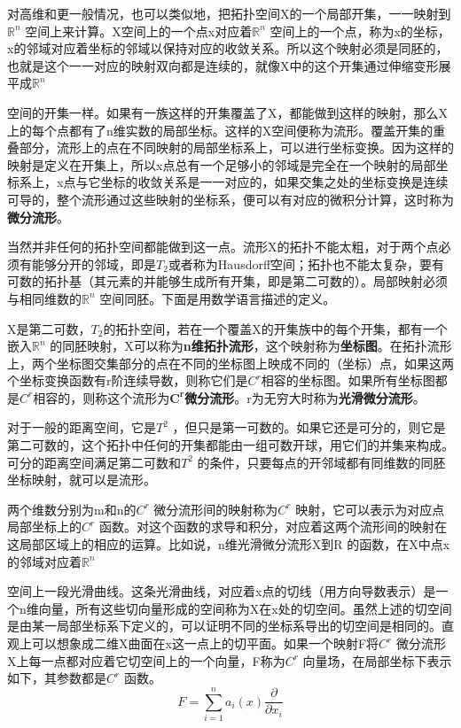 对高维和更一般情况，也可以类似地，把拓扑空间X的一个局部开集，一一映射到$ \mathbb{R}^n $ 
空间上来计算。X空间上的一个点x对应着$ \mathbb{R}^n $ 空间上的一个点，称为x的坐标，x的邻域对应着坐标的邻域以保持对应的收敛关系。所以这个映射必须是同胚的，也就是这个一一对应的映射双向都是连续的，就像X中的这个开集通过伸缩变形展平成$ \mathbb{R}^n $ 

空间的开集一样。如果有一族这样的开集覆盖了X，都能做到这样的映射，那么X上的每个点都有了n维实数的局部坐标。这样的X空间便称为流形。覆盖开集的重叠部分，流形上的点在不同映射的局部坐标系上，可以进行坐标变换。因为这样的映射是定义在开集上，所以x点总有一个足够小的邻域是完全在一个映射的局部坐标系上，x点与它坐标的收敛关系是一一对应的，如果交集之处的坐标变换是连续可导的，整个流形通过这些映射的坐标系，便可以有对应的微积分计算，这时称为\textbf{微分流形}。

当然并非任何的拓扑空间都能做到这一点。流形X的拓扑不能太粗，对于两个点必须有能够分开的邻域，即是$ T_2 $或者称为Hausdorff空间；拓扑也不能太复杂，要有可数的拓扑基（其元素的并能够生成所有开集，即是第二可数的）。局部映射必须与相同维数的$ \mathbb{R}^n $  空间同胚。下面是用数学语言描述的定义。

\kaishu\setlength{\leftskip}{1em}

X是第二可数，$ T_2 $的拓扑空间，若在一个覆盖X的开集族中的每个开集，都有一个嵌入$ \mathbb{R}^n $ 的同胚映射，X可以称为\textbf{n维拓扑流形}，这个映射称为\textbf{坐标图}。在拓扑流形上，两个坐标图交集部分的点在不同的坐标图上映成不同的（坐标）点，如果这两个坐标变换函数有r阶连续导数，则称它们是$ C^r $相容的坐标图。如果所有坐标图都是$ C^r $相容的，则称这个流形为$ \bm{C^r} $\textbf{微分流形}。r为无穷大时称为\textbf{光滑微分流形}。

\songti\setlength{\leftskip}{0em}

对于一般的距离空间，它是$ T^2 $ ，但只是第一可数的。如果它还是可分的，则它是第二可数的，这个拓扑中任何的开集都能由一组可数开球，用它们的并集来构成。可分的距离空间满足第二可数和$ T^2 $ 的条件，只要每点的开邻域都有同维数的同胚坐标映射，就可以是流形。

两个维数分别为m和n的$ C^r $ 微分流形间的映射称为$ C^r $ 映射，它可以表示为对应点局部坐标上的$ C^r $ 函数。对这个函数的求导和积分，对应着这两个流形间的映射在这局部区域上的相应的运算。比如说，n维光滑微分流形X到R
的函数，在X中点x的邻域对应着$ \mathbb{R}^n $ 

空间上一段光滑曲线。这条光滑曲线，对应着x点的切线（用方向导数表示）是一个n维向量，所有这些切向量形成的空间称为X在x处的切空间。虽然上述的切空间是由某一局部坐标系下定义的，可以证明不同的坐标系导出的切空间是相同的。直观上可以想象成二维X曲面在x这一点上的切平面。如果一个映射F将$ C^r $ 微分流形X上每一点都对应着它切空间上的一个向量，F称为$ C^r $ 向量场，在局部坐标下表示如下，其参数都是$ C^r $ 函数。
\begin{equation}
	F = \sum _{i=1}^n a_i(x)\frac{\partial }{\partial x_i}
\end{equation}

